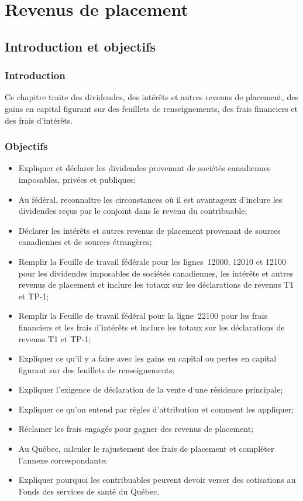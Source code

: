 \chapter{Revenus de placement}
\section{Introduction et objectifs}
\subsection{Introduction}
Ce chapitre traite des dividendes, des intérêts et autres revenus de placement, des gains en capital figurant sur des feuillets de renseignements, des frais financiers et des frais d'intérêts.


\subsection{Objectifs}
\begin{itemize}[label=]
	\item Expliquer et déclarer les dividendes provenant de sociétés canadiennes imposables, privées et publiques;
	\item Au fédéral, reconnaître les circonstances où il est avantageux d'inclure les dividendes reçus par le conjoint dans le revenu du contribuable;
	\item Déclarer les intérêts et autres revenus de placement provenant de sources canadiennes et de sources étrangères;
	\item Remplir la Feuille de travail fédérale pour les lignes~12000, 12010 et 12100 pour les dividendes imposables de sociétés canadiennes, les intérêts et autres revenus de placement et inclure les totaux sur les déclarations de revenus T1 et TP-1;
	\item Remplir la Feuille de travail fédéral pour la ligne~22100 pour les frais financiers et les frais d'intérêts et inclure les totaux sur les déclarations de revenus T1 et TP-1;
	\item Expliquer ce qu'il y a faire avec les gains en capital ou pertes en capital figurant sur des feuillets de renseignements;
	\item Expliquer l'exigence de déclaration de la vente d'une résidence principale;
	\item Expliquer ce qu'on entend par règles d'attribution et comment les appliquer;
	\item Réclamer les frais engagés pour gagner des revenus de placement;
	\item Au Québec, calculer le rajustement des frais de placement et compléter l'annexe correspondante;
	\item Expliquer pourquoi les contribuables peuvent devoir verser des cotisations au Fonds des services de santé du Québec.
\end{itemize}


